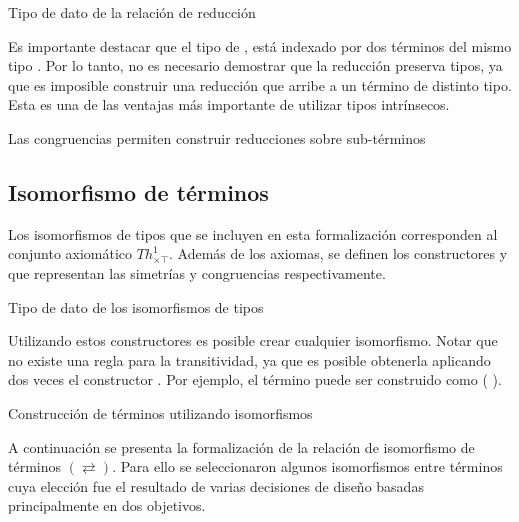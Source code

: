 \begin{codigo}
	Tipo de dato de la relación de reducción
	
\end{codigo}

Es importante destacar que el tipo de \type{$\_\hookrightarrow\_$}, está indexado por dos términos del mismo tipo .
Por lo tanto, no es necesario demostrar que la reducción preserva tipos, ya que es imposible construir una reducción que arribe a un término de distinto tipo.
Esta es una de las ventajas más importante de utilizar tipos intrínsecos.

\begin{example}
	Las congruencias permiten construir reducciones sobre sub-términos
\end{example}

\subsection{Isomorfismo de términos}

Los isomorfismos de tipos que se incluyen en esta formalización corresponden al conjunto axiomático $Th^1_{\times\top}$.
Además de los axiomas, se definen los constructores  y  que representan las simetrías y congruencias respectivamente.

\begin{codigo}
	Tipo de dato de los isomorfismos de tipos
	
\end{codigo}
Utilizando estos constructores es posible crear cualquier isomorfismo.
Notar que no existe una regla para la transitividad, ya que es posible obtenerla aplicando dos veces el constructor \const{$[\_]\equiv\_$}.
Por ejemplo, el término \const{[ trans}   \const{]$\equiv$}  puede ser construido como \const{[}  \const{]$\equiv$} (\const{[}  \const{]$\equiv$} ).

\begin{example}
	Construcción de términos utilizando isomorfismos
\end{example}

A continuación se presenta la formalización de la relación de isomorfismo de términos $(\rightleftarrows)$.
Para ello se seleccionaron algunos isomorfismos entre términos cuya elección fue el resultado de varias decisiones de diseño basadas principalmente en dos objetivos.

